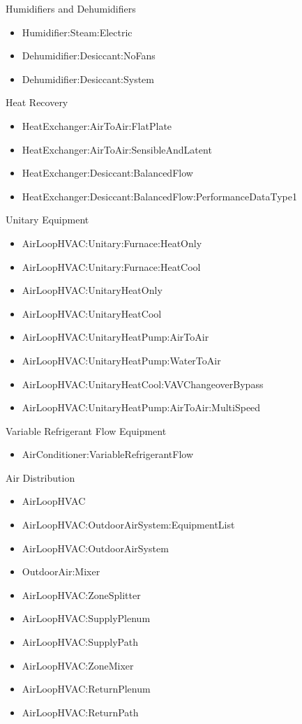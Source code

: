 Humidifiers and Dehumidifiers

\begin{itemize}
\tightlist
\item
  Humidifier:Steam:Electric
\item
  Dehumidifier:Desiccant:NoFans
\item
  Dehumidifier:Desiccant:System
\end{itemize}

Heat Recovery

\begin{itemize}
\tightlist
\item
  HeatExchanger:AirToAir:FlatPlate
\item
  HeatExchanger:AirToAir:SensibleAndLatent
\item
  HeatExchanger:Desiccant:BalancedFlow
\item
  HeatExchanger:Desiccant:BalancedFlow:PerformanceDataType1
\end{itemize}

Unitary Equipment

\begin{itemize}
\tightlist
\item
  AirLoopHVAC:Unitary:Furnace:HeatOnly
\item
  AirLoopHVAC:Unitary:Furnace:HeatCool
\item
  AirLoopHVAC:UnitaryHeatOnly
\item
  AirLoopHVAC:UnitaryHeatCool
\item
  AirLoopHVAC:UnitaryHeatPump:AirToAir
\item
  AirLoopHVAC:UnitaryHeatPump:WaterToAir
\item
  AirLoopHVAC:UnitaryHeatCool:VAVChangeoverBypass
\item
  AirLoopHVAC:UnitaryHeatPump:AirToAir:MultiSpeed
\end{itemize}

Variable Refrigerant Flow Equipment

\begin{itemize}
\tightlist
\item
  AirConditioner:VariableRefrigerantFlow
\end{itemize}

Air Distribution

\begin{itemize}
\tightlist
\item
  AirLoopHVAC
\item
  AirLoopHVAC:OutdoorAirSystem:EquipmentList
\item
  AirLoopHVAC:OutdoorAirSystem
\item
  OutdoorAir:Mixer
\item
  AirLoopHVAC:ZoneSplitter
\item
  AirLoopHVAC:SupplyPlenum
\item
  AirLoopHVAC:SupplyPath
\item
  AirLoopHVAC:ZoneMixer
\item
  AirLoopHVAC:ReturnPlenum
\item
  AirLoopHVAC:ReturnPath
\end{itemize}

